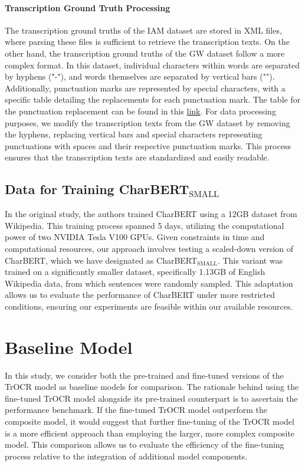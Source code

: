 \paragraph*{Transcription Ground Truth Processing}
\label{par:3_transcription_gound_truth_processing}
The transcription ground truths of the IAM dataset are stored in XML files, where parsing these files is sufficient to retrieve the transcription texts. On the other hand, the transcription ground truths of the GW dataset follow a more complex format. In this dataset, individual characters within words are separated by hyphens ("-"), and words themselves are separated by vertical bars ("\textbar"). Additionally, punctuation marks are represented by special characters, with a specific table detailing the replacements for each punctuation mark. The table for the punctuation replacement can be found in this \href{https://github.com/Yung-Hsin-Chen/master_thesis/blob/src/model/config/punctuation_list.json}{link}. 
For data processing purposes, we modify the transcription texts from the GW dataset by removing the hyphens, replacing vertical bars and special characters representing punctuations with spaces and their respective punctuation marks. This process ensures that the transcription texts are standardized and easily readable. 
\subsection{Data for Training CharBERT$_{\text{SMALL}}$}
\label{subsec:3_data_for_training_charbert}
In the original study, the authors trained CharBERT using a 12GB dataset from Wikipedia. This training process spanned 5 days, utilizing the computational power of two NVIDIA Tesla V100 GPUs. Given constraints in time and computational resources, our approach involves testing a scaled-down version of CharBERT, which we have designated as CharBERT$_{\text{SMALL}}$. This variant was trained on a significantly smaller dataset, specifically 1.13GB of English Wikipedia data, from which sentences were randomly sampled. This adaptation allows us to evaluate the performance of CharBERT under more restricted conditions, ensuring our experiments are feasible within our available resources.
\section{Baseline Model}
\label{sec:4_baseline_model}
In this study, we consider both the pre-trained and fine-tuned versions of the TrOCR model as baseline models for comparison. The rationale behind using the fine-tuned TrOCR model alongside its pre-trained counterpart is to ascertain the performance benchmark. If the fine-tuned TrOCR model outperform the composite model, it would suggest that further fine-tuning of the TrOCR model is a more efficient approach than employing the larger, more complex composite model. This comparison allows us to evaluate the efficiency of the fine-tuning process relative to the integration of additional model components.
